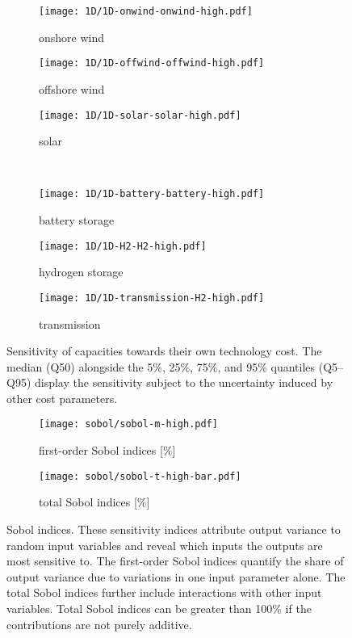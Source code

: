 \begin{figure}
    \begin{subfigure}[t]{0.32\textwidth}
        \caption{onshore wind}
        \texttt{[image: 1D/1D-onwind-onwind-high.pdf]}
    \end{subfigure}
    \begin{subfigure}[t]{0.32\textwidth}
        \caption{offshore wind}
        \texttt{[image: 1D/1D-offwind-offwind-high.pdf]}
    \end{subfigure}
    \begin{subfigure}[t]{0.32\textwidth}
        \caption{solar}
        \texttt{[image: 1D/1D-solar-solar-high.pdf]}
    \end{subfigure} \\
    \begin{subfigure}[t]{0.32\textwidth}
        \caption{battery storage}
        \texttt{[image: 1D/1D-battery-battery-high.pdf]}
    \end{subfigure}
    \begin{subfigure}[t]{0.32\textwidth}
        \caption{hydrogen storage}
        \texttt{[image: 1D/1D-H2-H2-high.pdf]}
    \end{subfigure}
    \begin{subfigure}[t]{0.32\textwidth}
        \caption{transmission}
        \texttt{[image: 1D/1D-transmission-H2-high.pdf]}
    \end{subfigure}
    \vspace{-0.3cm}
    \caption{
      Sensitivity of capacities towards their own technology cost.
      The median (Q50) alongside the 5\%, 25\%, 75\%, and 95\% quantiles (Q5--Q95) display
      the sensitivity subject to the uncertainty induced by other cost parameters.
    }
    \label{fig:sensitivity}
\end{figure}

\begin{figure}
    \begin{subfigure}[t]{0.45\textwidth}
        \caption{first-order Sobol indices [\%]}
        \label{fig:sobol:first}
        \texttt{[image: sobol/sobol-m-high.pdf]}
    \end{subfigure}
    \begin{subfigure}[t]{0.54\textwidth}
        \caption{total Sobol indices [\%]}
        \label{fig:sobol:total}
        \texttt{[image: sobol/sobol-t-high-bar.pdf]}
    \end{subfigure}
    \vspace{-0.3cm}
    \caption[First-order and total Sobol indices]{
      Sobol indices. These sensitivity indices attribute output variance to random input variables
      and reveal which inputs the outputs are most sensitive to. The first-order Sobol indices
      quantify the share of output variance due to variations in one input parameter alone.
      The total Sobol indices further include interactions with other input variables.
      Total Sobol indices can be greater than 100\% if the contributions are not purely additive.
    }
    \label{fig:sobol}
\end{figure}

